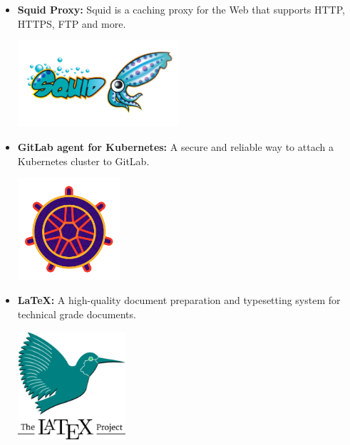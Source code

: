 \begin{itemize}
          \newpage
    \item \textbf{Squid Proxy:} \newline \cite{squid} Squid is a caching proxy for the Web that supports HTTP, HTTPS, FTP and more. \newline
          \begin{minipage}{\linewidth}
              \centering
              \includegraphics[width=6cm]{src/assets/logos/squid-proxy.png}
          \end{minipage}
    \item \textbf{GitLab agent for Kubernetes:} \newline \cite{kas-blog} A secure and reliable way to attach a Kubernetes cluster to GitLab. \newline
          \begin{minipage}{\linewidth}
              \centering
              \includegraphics[width=3.8cm]{src/assets/logos/gitlab-kubernetes-agent_512x512.png}
          \end{minipage}
    \item \textbf{LaTeX:} \newline \cite{latex-project} A high-quality document preparation and typesetting system for technical grade documents. \newline
          \begin{minipage}{\linewidth}
              \centering
              \includegraphics[width=4cm]{src/assets/logos/latex_200x200.png}
          \end{minipage}

          \newpage
\end{itemize}

